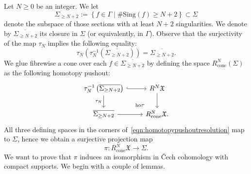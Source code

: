 \documentclass[a4paper]{amsart}
\newcommand{\fX}{\mathfrak X}
\newcommand{\lra}{\longrightarrow}
\theoremstyle{plain}
\theoremstyle{definition}
\begin{document}
\bigskip

Let $N \geq 0$ be an integer. We let
\begin{equation}
    \Sigma_{\geq N+2} := \left\{ f \in \Gamma \mid \# \mathrm{Sing}(f) \geq N+2 \right\} \subset \Sigma
\end{equation}
denote the subspace of those sections with at least $N+2$ singularities. We denote by $\overline{\Sigma_{\geq N+2}}$ its closure in $\Sigma$ (or equivalently, in $\Gamma$). Observe that the surjectivity of the map $\tau_N$ implies the following equality:
\[
    \tau_N \left( \tau_N^{-1}\left(\overline{\Sigma_{\geq N+2}}\right)  \right) = \overline{\Sigma_{\geq N+2}}.
\]
We glue fibrewise a cone over each $f \in \overline{\Sigma_{\geq N+2}}$ by defining the space $R^N_{\text{cone}}(\Sigma)$ as the following homotopy pushout:
\begin{equation}\label{eqn:homotopypushoutresolution}
\begin{tikzcd}
\tau_N^{-1}\left(\overline{\Sigma_{\geq N+2}}\right) \arrow[d, "\tau_N"'] \arrow[r, hook] \arrow[dr, phantom, "^\mathrm{ho}\ulcorner", very near end] & R^N\fX \arrow[d]      \\
\overline{\Sigma_{\geq N+2}} \arrow[r]                                           & R^N_{\text{cone}}\fX.
\end{tikzcd}
\end{equation}
All three defining spaces in the corners of~\eqref{eqn:homotopypushoutresolution} map to $\Sigma$, hence we obtain a surjective projection map
\begin{equation}\label{eqn:piprojectionconed}
    \pi \colon R^N_{\text{cone}}\fX \lra \Sigma.
\end{equation}
We want to prove that $\pi$ induces an isomorphism in \v{Cech} cohomology with compact supports. We begin with a couple of lemmas.
\end{document}
